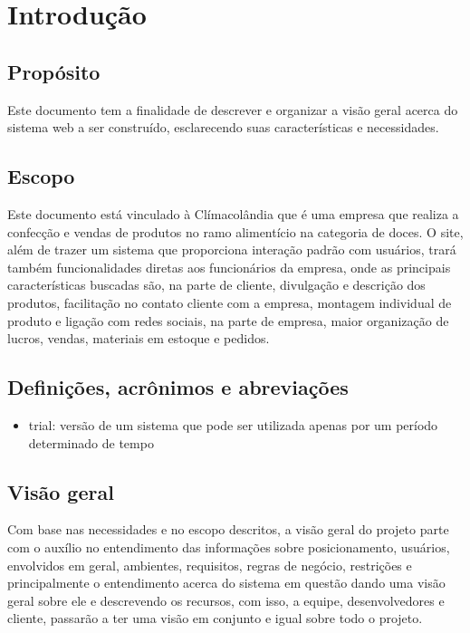 \section{Introdução}
\subsection{Propósito}

Este documento tem a finalidade de descrever e organizar a visão geral acerca do sistema web a ser construído, esclarecendo suas características e necessidades.

\subsection{Escopo}

Este documento está vinculado à Clímacolândia que é uma empresa que realiza a confecção e vendas de produtos no ramo alimentício na categoria de doces. O site, além de trazer um sistema que proporciona interação padrão com usuários, trará também funcionalidades diretas aos funcionários da empresa, onde as principais características buscadas são, na parte de cliente, divulgação e descrição dos produtos, facilitação no contato cliente com a empresa, montagem individual de produto e ligação com redes sociais, na parte de empresa, maior organização de lucros, vendas, materiais em estoque e pedidos. 

\subsection{Definições, acrônimos e abreviações}

\begin{itemize}
	\item trial: versão de um sistema que pode ser utilizada apenas por um período determinado de tempo
\end{itemize}

\subsection{Visão geral}

Com base nas necessidades e no escopo descritos, a visão geral do projeto parte com o auxílio no entendimento das informações sobre posicionamento, usuários, envolvidos em geral, ambientes, requisitos, regras de negócio, restrições e principalmente o entendimento acerca do sistema em questão dando uma visão geral sobre ele e descrevendo os recursos, com isso, a equipe, desenvolvedores e cliente, passarão a ter uma visão em conjunto e igual sobre todo o projeto.

